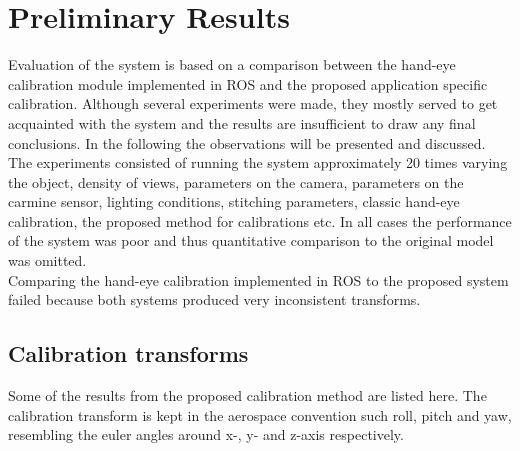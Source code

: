 \chapter{Preliminary Results}
Evaluation of the system is based on a comparison between the hand-eye calibration module implemented in ROS and the proposed application specific calibration. Although several experiments were made, they mostly served to get acquainted with the system and the results are insufficient to draw any final conclusions. In the following the observations will be presented and discussed.\\

The experiments consisted of running the system approximately 20 times varying the object, density of views, parameters on the camera, parameters on the carmine sensor, lighting conditions, stitching parameters, classic hand-eye calibration, the proposed method for calibrations etc. In all cases the performance of the system was poor and thus quantitative comparison to the original model was omitted. \\

Comparing the hand-eye calibration implemented in ROS to the proposed system failed because both systems produced very inconsistent transforms.\\

\section{Calibration transforms}
Some of the results from the proposed calibration method are listed here. The calibration transform is kept in the aerospace convention such roll, pitch and yaw, resembling the euler angles around x-, y- and z-axis respectively. 